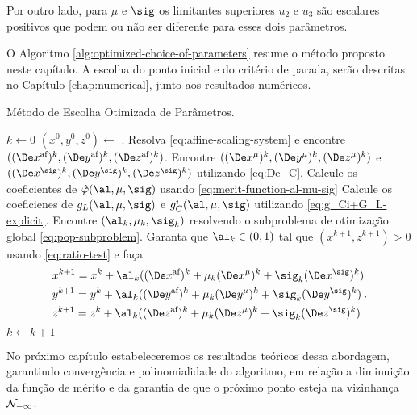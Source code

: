 Por outro lado, para $\mu$ e $\sig$ os limitantes superiores $u_{2}$ e $u_{3}$ são escalares positivos que podem ou não ser diferente para esses dois parâmetros.

 
O Algoritmo \ref{alg:optimized-choice-of-parameters} resume o método proposto neste capítulo. A escolha do ponto inicial e do critério de parada, serão descritas no Capítulo \ref{chap:numerical}, junto aos resultados numéricos.

\begin{algorithm}
\onehalfspacing
\caption{Método de Escolha Otimizada de Parâmetros.}
\label{alg:optimized-choice-of-parameters} \begin{algorithmic}[1]
\State $k \gets 0$
\State $(x^0,y^0,z^0) \gets$ .
	\Repeat
		\State Resolva   \eqref{eq:affine-scaling-system} e encontre
		$((\dex)^{k},(\dey)^{k},(\dez)^{k})$.
		\State 	Encontre $((\Dex^\mu)^{k},(\Dey^\mu)^{k},(\Dez^\mu)^{k})$ e
		$((\Dex^\sig)^{k},(\Dey^\sig)^{k},(\Dez^\sig)^{k})$ utilizando
		\eqref{eq:De_C}.
		\State Calcule os coeficientes de  $\nextphi(\al,\mu,\sig)$ usando
		\eqref{eq:merit-function-al-mu-sig} 
		\State Calcule os coeficienes de $g_{L}(\al,\mu,\sig)$ e $g^{i}_{C}(\al,\mu,\sig)$ utilizando \eqref{eq:g_Ci+G_L-explicit}.
		\State Encontre $(\alk,\muk,\sigk)$ resolvendo o subproblema de
		otimização global 
		\eqref{eq:pop-subproblem}.
		\State Garanta que $\alk \in(0,1)$ tal que $(x^{k+1},z^{k+1})>0$ usando \eqref{eq:ratio-test} e faça
		\[
		\begin{aligned}	
		& x^{k+1} = x^{k} + \alk ((\dex)^{k} + \muk (\Dex^\mu)^{k} +
		\sigk(\Dex^\sig)^{k} )
		\\
		& y^{k+1} = y^{k} + \alk ((\dey)^{k} + \muk (\Dey^\mu)^{k} +
		\sigk (\Dey^\sig)^{k} )
		\\
		& z^{k+1} = z^{k} + \alk ((\dez)^{k} + \muk (\Dez^\mu)^{k} +
		\sigk (\Dez^\sig)^{k} ) \end{aligned}. 
		\]		
		\State $k\gets k+1$
\EndProcedure
\end{algorithmic}
\end{algorithm}
  
 No próximo capítulo estabeleceremos os resultados teóricos dessa abordagem, garantindo convergência e polinomialidade do algoritmo, em relação a diminuição da função de mérito e da garantia de que o próximo ponto esteja na vizinhança $\mathcal{N}_{-\infty}$.
 
